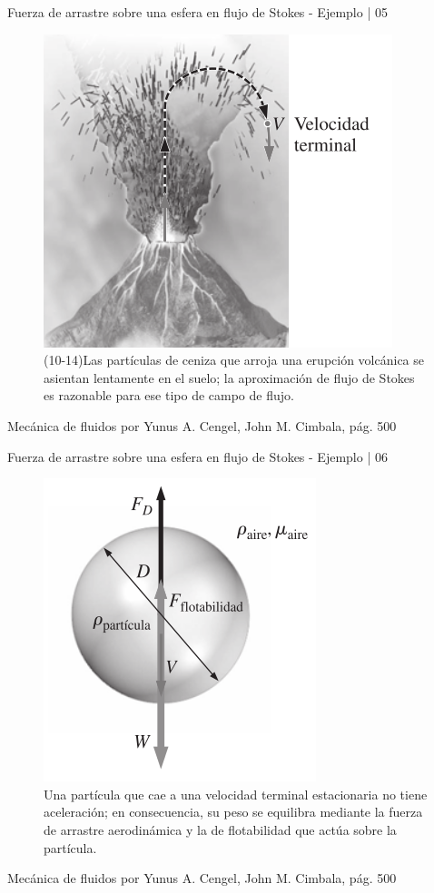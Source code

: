 \begin{frame}{Fuerza de arrastre sobre una esfera en flujo de Stokes - Ejemplo | 05}
\begin{figure}[H]
\centering
\includegraphics[scale=0.35]{Section_Files/S3-imagenes-Jhon/0033.png}
\caption{(10-14)Las partículas de ceniza que arroja una erupción volcánica se asientan lentamente en el suelo; la aproximación de flujo de Stokes es razonable para ese tipo de campo de flujo.}
\end{figure}
{\tiny Mecánica de fluidos por Yunus A. Cengel, John M. Cimbala, pág. 500}
\end{frame}

\begin{frame}{Fuerza de arrastre sobre una esfera en flujo de Stokes - Ejemplo | 06}
\justifying
\begin{figure}[H]
\includegraphics[scale=0.35]{Section_Files/S3-imagenes-Jhon/0034.png}
\caption{Una partícula que cae a una velocidad terminal estacionaria no tiene aceleración; en consecuencia, su peso se equilibra mediante la fuerza de arrastre aerodinámica y la de flotabilidad que actúa sobre la partícula.}
\end{figure}
{\tiny Mecánica de fluidos por Yunus A. Cengel, John M. Cimbala, pág. 500}
\end{frame}

